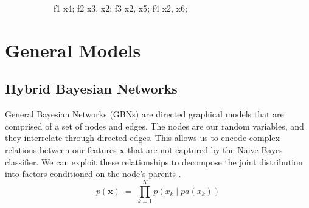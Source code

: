 \documentclass{article}
\begin{document}
\begin{figure}
\begin{subfigure}[t]{0.45\textwidth}
{{           {f1} {x4}; %
           {f2} {x3, x2}; %
           {f3} {x2, x5}; %
           {f4} {x2, x6}; %
        }}
    \end{subfigure}
\end{figure}

\section{General Models}
\label{sec:general-models}
\subsection{Hybrid Bayesian Networks}
\label{sec:BN}
General Bayesian Networks (GBNs) are directed graphical models that are
comprised of a set of nodes and edges. The nodes are our random variables,
and they interrelate through directed edges. This allows us to
encode complex relations between our features $\mathbf{x}$ that are not
captured by the Naive Bayes classifier. We can exploit these relationships
to decompose the joint distribution into factors conditioned on the node's
parents \cite{murphy}.
\begin{equation}
  p(\mathbf{x}) \; = \; \prod_{k=1}^K p(x_k \mid pa(x_k))
\end{equation}
\end{document}
